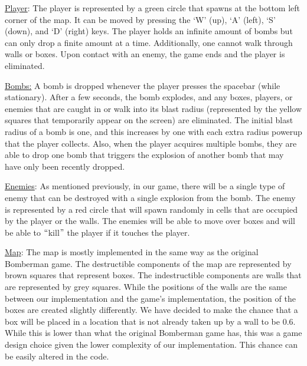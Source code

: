 \documentclass[12pt]{article}
\begin{document}
\vspace{\baselineskip}
\uline{Player}: The player is represented by a green circle that spawns at the bottom left corner of the map. It can be moved by pressing the ‘W’ (up), ‘A’ (left), ‘S’ (down), and ‘D’ (right) keys. The player holds an infinite amount of bombs but can only drop a finite amount at a time. Additionally, one cannot walk through walls or boxes. Upon contact with an enemy, the game ends and the player is eliminated.\par


\vspace{\baselineskip}
\uline{Bombs:} A bomb is dropped whenever the player presses the spacebar (while stationary). After a few seconds, the bomb explodes, and any boxes, players, or enemies that are caught in or walk into its blast radius (represented by the yellow squares that temporarily appear on the screen) are eliminated. The initial blast radius of a bomb is one, and this increases by one with each extra radius powerup that the player collects. Also, when the player acquires multiple bombs, they are able to drop one bomb that triggers the explosion of another bomb that may have only been recently dropped.\par


\vspace{\baselineskip}
\uline{Enemies}: As mentioned previously, in our game, there will be a single type of enemy that can be destroyed with a single explosion from the bomb. The enemy is represented by a red circle that will spawn randomly in cells that are occupied by the player or the walls. The enemies will be able to move over boxes and will be able to $``$kill$"$  the player if it touches the player.\par


\vspace{\baselineskip}
\uline{Map}: The map is mostly implemented in the same way as the original Bomberman game. The destructible components of the map are represented by brown squares that represent boxes. The indestructible components are walls that are represented by grey squares. While the positions of the walls are the same between our implementation and the game’s implementation, the position of the boxes are created slightly differently. We have decided to make the chance that a box will be placed in a location that is not already taken up by a wall to be 0.6. While this is lower than what the original Bomberman game has, this was a game design choice given the lower complexity of our implementation. This chance can be easily altered in the code.\par
\end{document}
